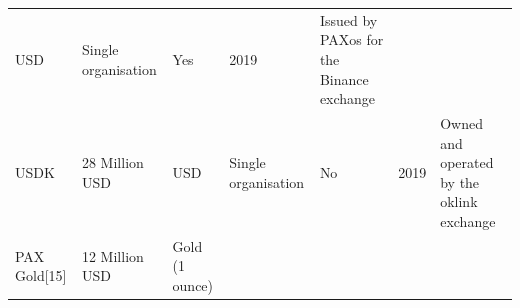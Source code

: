 \documentclass[english,]{IEEEtran}
\begin{document}
\begin{longtable}[]{@{}lllllll@{}}
\begin{minipage}[t]{0.08\columnwidth}
USD\strut
\end{minipage} & \begin{minipage}[t]{0.10\columnwidth}\raggedright\strut
Single organisation\strut
\end{minipage} & \begin{minipage}[t]{0.08\columnwidth}\raggedright\strut
Yes\strut
\end{minipage} & \begin{minipage}[t]{0.04\columnwidth}\raggedright\strut
2019\strut
\end{minipage} & \begin{minipage}[t]{0.30\columnwidth}\raggedright\strut
Issued by PAXos for the Binance exchange\strut
\end{minipage}\tabularnewline
\begin{minipage}[t]{0.14\columnwidth}\raggedright\strut
USDK\strut
\end{minipage} & \begin{minipage}[t]{0.08\columnwidth}\raggedright\strut
28 Million USD\strut
\end{minipage} & \begin{minipage}[t]{0.08\columnwidth}\raggedright\strut
USD\strut
\end{minipage} & \begin{minipage}[t]{0.10\columnwidth}\raggedright\strut
Single organisation\strut
\end{minipage} & \begin{minipage}[t]{0.08\columnwidth}\raggedright\strut
No\strut
\end{minipage} & \begin{minipage}[t]{0.04\columnwidth}\raggedright\strut
2019\strut
\end{minipage} & \begin{minipage}[t]{0.30\columnwidth}\raggedright\strut
Owned and operated by the oklink exchange\strut
\end{minipage}\tabularnewline
\begin{minipage}[t]{0.14\columnwidth}\raggedright\strut
PAX Gold{[}15{]}\strut
\end{minipage} & \begin{minipage}[t]{0.08\columnwidth}\raggedright\strut
12 Million USD\strut
\end{minipage} & \begin{minipage}[t]{0.08\columnwidth}\raggedright\strut
Gold (1 ounce)\strut
\end{minipage} & \begin{minipage}[t]{0.10\columnwidth}\raggedright\strut

\end{minipage}
\end{longtable}
\end{document}
